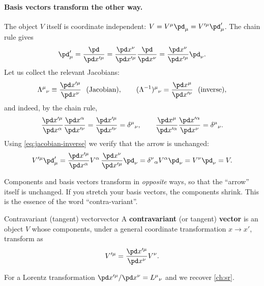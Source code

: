 \paragraph{Basis vectors transform the other way.} The object $V$ itself is coordinate independent: $V=V^\mu\pd_\mu=V'^\mu\pd'_\mu$. The chain rule gives
\begin{equation}
  \pd'_\mu=\frac{\pd}{\pd x'^\mu}=\frac{\pd x^\nu}{\pd x'^\mu}\frac{\pd}{\pd x^\nu}=\frac{\pd x^\nu}{\pd x'^\mu}\pd_\nu .
\end{equation}
Let us collect the relevant Jacobians:
\begin{equation}
  \Lambda^\mu{}_\nu\equiv\frac{\pd x'^\mu}{\pd x^\nu}\ \ \text{(Jacobian)},\qquad
  (\Lambda^{-1})^\mu{}_\nu=\frac{\pd x^\mu}{\pd x'^\nu}\ \ \text{(inverse)},
\end{equation}
and indeed, by the chain rule,
\begin{equation}
  \frac{\pd x'^\mu}{\pd x^\alpha}\frac{\pd x^\alpha}{\pd x'^\nu}=\frac{\pd x'^\mu}{\pd x'^\nu}=\delta^\mu{}_\nu,\qquad
  \frac{\pd x^\mu}{\pd x'^\alpha}\frac{\pd x'^\alpha}{\pd x^\nu}=\delta^\mu{}_\nu .
  \label{eq:jacobian-inverse}
\end{equation}
Using \eqref{eq:jacobian-inverse} we verify that the arrow is unchanged:
\begin{equation}
  V'^\mu\pd'_\mu=\frac{\pd x'^\mu}{\pd x^\alpha}V^\alpha\,\frac{\pd x^\nu}{\pd x'^\mu}\pd_\nu=\delta^\nu{}_\alpha V^\alpha\pd_\nu=V^\nu\pd_\nu=V .
\end{equation}

\begin{remarkbox}
Components and basis vectors transform in \emph{opposite} ways, so that the ``arrow'' itself is unchanged. If you stretch your basis vectors, the components shrink. This is the essence of the word ``contra-variant''.
\end{remarkbox}

\begin{definition}{Contravariant (tangent) vector}{vector}
A \textbf{contravariant} (or tangent) \textbf{vector} is an object $V$ whose components, under a general coordinate transformation $x\to x'$, transform as
\begin{equation}
  V'^\mu=\frac{\pd x'^\mu}{\pd x^\nu}V^\nu .
\end{equation}
\end{definition}
For a Lorentz transformation $\pd x'^\mu/\pd x^\nu=L^\mu{}_\nu$ and we recover \cref{ch:sr}.

